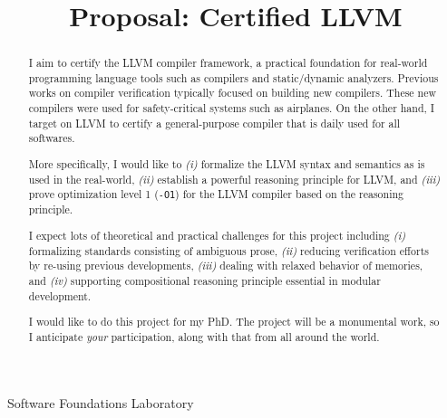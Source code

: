 \documentclass[nocopyrightspace]{sigplanconf}
\begin{document}
\setlength{\pdfpageheight}{\paperheight}
\setlength{\pdfpagewidth}{\paperwidth}






\title{Proposal: Certified LLVM}

           {Software Foundations Laboratory}
           {}

\maketitle

\begin{abstract}
  I aim to certify the LLVM compiler framework, a practical foundation
  for real-world programming language tools such as compilers and
  static/dynamic analyzers.  Previous works on compiler verification
  typically focused on building new compilers.  These new compilers
  were used for safety-critical systems such as airplanes.  On the
  other hand, I target on LLVM to certify a general-purpose compiler
  that is daily used for all softwares.

  More specifically, I would like to \emph{(i)} formalize the LLVM
  syntax and semantics as is used in the real-world, \emph{(ii)}
  establish a powerful reasoning principle for LLVM, and \emph{(iii)}
  prove optimization level 1 (\texttt{-O1}) for the LLVM compiler
  based on the reasoning principle.

  I expect lots of theoretical and practical challenges for this
  project including \emph{(i)} formalizing standards consisting of
  ambiguous prose, \emph{(ii)} reducing verification efforts by
  re-using previous developments, \emph{(iii)} dealing with relaxed
  behavior of memories, and \emph{(iv)} supporting compositional
  reasoning principle essential in modular development.

  I would like to do this project for my PhD.  The project will be a
  monumental work, so I anticipate \emph{your} participation, along
  with that from all around the world.
\end{abstract}
\end{document}
